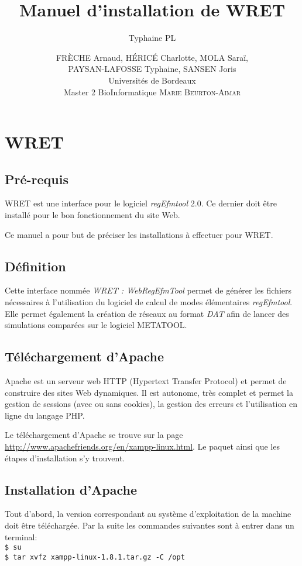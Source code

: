 \documentclass[12pt,a4paper]{article}
\author{Typhaine PL}
\title{Manuel d'installation de WRET}
\author{\textsc{FR\`ECHE} Arnaud, \textsc{H\'ERIC\'E} Charlotte, \textsc{MOLA} Saraï,\\ \textsc{PAYSAN-LAFOSSE} Typhaine, \textsc{SANSEN} Joris \\ 
Universités de Bordeaux\\
Master 2 BioInformatique
\textsc{Marie \textsc{Beurton-Aimar}}}
\date{}
\begin{document}
\maketitle

\section{WRET}
\subsection{Pré-requis}
WRET est une interface pour le logiciel \textit{regEfmtool} 2.0. Ce dernier doit \^etre installé pour le bon fonctionnement du site Web.

Ce manuel a pour but de préciser les installations à effectuer pour WRET.

\subsection{Définition}

Cette interface nommée \emph{WRET : WebRegEfmTool} permet de générer les fichiers nécessaires à l'utilisation du logiciel de calcul de modes élémentaires \textit{regEfmtool}. Elle permet également la création de réseaux au format \emph{DAT} afin de lancer des simulations comparées sur le logiciel METATOOL.

\subsection{Téléchargement d'Apache}

Apache est un serveur web HTTP (Hypertext Transfer Protocol) et permet de construire des sites Web dynamiques. Il est autonome, très complet et permet la gestion de sessions (avec ou sans cookies), la gestion des erreurs et l'utilisation en ligne du langage PHP.

Le téléchargement d'Apache se trouve sur la page \url{http://www.apachefriends.org/en/xampp-linux.html}. Le paquet ainsi que les étapes d'installation s'y trouvent.


\subsection{Installation d'Apache}

Tout d'abord, la version correspondant au système d'exploitation de la machine doit être téléchargée. Par la suite les commandes suivantes sont à entrer dans un terminal:\\
\texttt{\$ su\\
\$ tar xvfz xampp-linux-1.8.1.tar.gz -C /opt\\}
\end{document}
